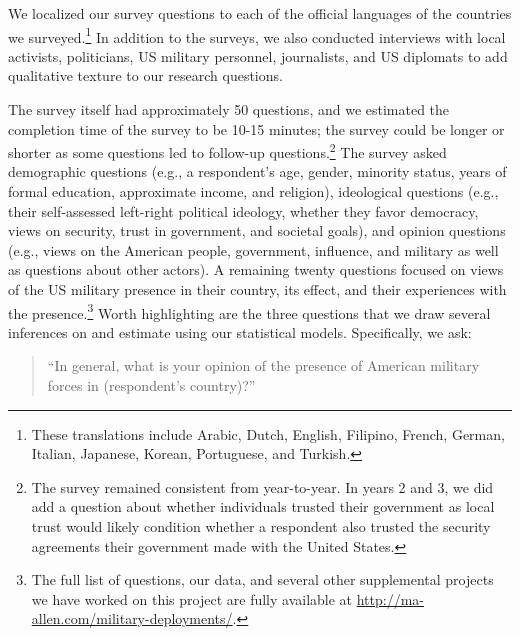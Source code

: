 We localized our survey questions to each of the official languages of the countries we surveyed.\footnote{These translations include Arabic, Dutch, English, Filipino, French, German, Italian, Japanese, Korean, Portuguese, and Turkish.}  In addition to the surveys, we also conducted interviews with local activists, politicians, US military personnel, journalists, and US diplomats to add qualitative texture to our research questions. 

The survey itself had approximately 50 questions, and we estimated the completion time of the survey to be 10-15 minutes; the survey could be longer or shorter as some questions led to follow-up questions.\footnote{The survey remained consistent from year-to-year. In years 2 and 3, we did add a question about whether individuals trusted their government as local trust would likely condition whether a respondent also trusted the security agreements their government made with the United States.} The survey asked demographic questions (e.g., a respondent's age, gender, minority status, years of formal education, approximate income, and religion), ideological questions (e.g., their self-assessed left-right political ideology, whether they favor democracy, views on security, trust in government, and societal goals), and opinion questions (e.g., views on the American people, government, influence, and military as well as questions about other actors). A remaining twenty questions focused on views of the US military presence in their country, its effect, and their experiences with the presence.\footnote{The full list of questions, our data, and several other supplemental projects we have worked on this project are fully available at \url{http://ma-allen.com/military-deployments/}.} Worth highlighting are the three questions that we draw several inferences on and estimate using our statistical models. Specifically, we ask:

\begin{quote}
	``In general, what is your opinion of the presence of American military forces in (respondent's
	country)?''
\end{quote}

